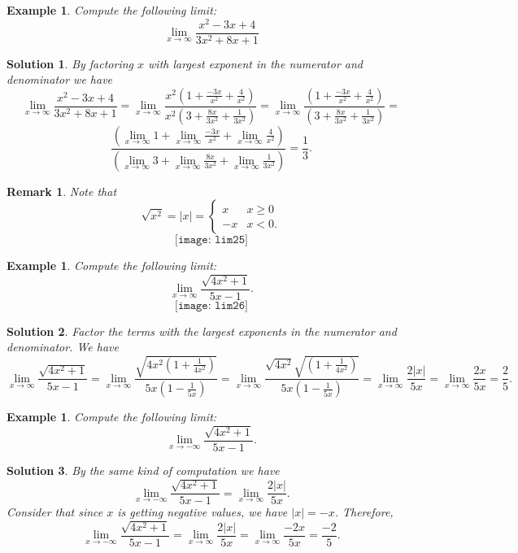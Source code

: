 \documentclass[12pt,a4paper]{book}
\newtheorem{Example}[theorem]{Example}
\numberwithin{equation}{section}
\newtheorem*{solution}{{\bf Solution}}
\newtheorem*{remark}{Remark}
\begin{document}
\begin{Example}
	Compute the following limit:
	$$\lim_{x\to \infty} \frac{x^2-3x+4}{3x^2+8x+1}$$
\end{Example}
\begin{solution}
	By factoring $x$ with largest exponent in the numerator and denominator we have
	$$\lim_{x\to \infty} \frac{x^2-3x+4}{3x^2+8x+1}=\lim_{x\to \infty} \frac{x^2( 1+\frac{-3x}{x^2}+\frac{4}{x^2} )}{x^2( 3+\frac{8x}{3x^2}+\frac{1}{3x^2} )}=\lim_{x\to \infty} \frac{( 1+\frac{-3x}{x^2}+\frac{4}{x^2} )}{( 3+\frac{8x}{3x^2}+\frac{1}{3x^2} )}=
	$$
	$$\frac{(\lim_{x\to \infty} 1+\lim_{x\to \infty}\frac{-3x}{x^2}+\lim_{x\to \infty}\frac{4}{x^2}) }{( \lim_{x\to \infty}3+\lim_{x\to \infty}\frac{8x}{3x^2}+\lim_{x\to \infty}\frac{1}{3x^2} )}=\frac{1}{3}.$$
\end{solution}
\begin{remark}
	Note that 
	$$\sqrt{x^2}=|x|=\begin{cases}
	x & x\geq 0\\
	-x & x<0.
	\end{cases}$$
	$$
	\texttt{[image: lim25]}
	$$
\end{remark}
\begin{Example}
	Compute the following limit:
	$$\lim_{x\to \infty} \frac{\sqrt{4x^2+1}}{5x-1}.$$
		$$
	\texttt{[image: lim26]}
	$$
\end{Example}

\begin{solution}
	Factor the terms with the largest exponents in the numerator and denominator. We have
	$$\lim_{x\to \infty} \frac{\sqrt{4x^2+1}}{5x-1}=\lim_{x\to \infty} \frac{\sqrt{4x^2(1+\frac{1}{4x^2})}}{5x(1-\frac{1}{5x})}=\lim_{x\to \infty} \frac{\sqrt{4x^2}\sqrt{(1+\frac{1}{4x^2})}}{5x(1-\frac{1}{5x})}=\lim_{x\to \infty} \frac{2|x|}{5x}=\lim_{x\to \infty} \frac{2x}{5x}=\frac{2}{5}.$$
\end{solution}



\begin{Example}
	Compute the following limit:
	$$\lim_{x\to -\infty} \frac{\sqrt{4x^2+1}}{5x-1}.$$
\end{Example}

\begin{solution}
	By the same kind of computation we have
		$$\lim_{x\to -\infty} \frac{\sqrt{4x^2+1}}{5x-1}=\lim_{x\to \infty} \frac{2|x|}{5x}.$$
	Consider that since $x$ is getting negative values, we have $|x|=-x$. Therefore,	
		$$\lim_{x\to -\infty} \frac{\sqrt{4x^2+1}}{5x-1}=\lim_{x\to \infty} \frac{2|x|}{5x}=\lim_{x\to \infty} \frac{-2x}{5x}=\frac{-2}{5}.$$
\end{solution}
\end{document}
